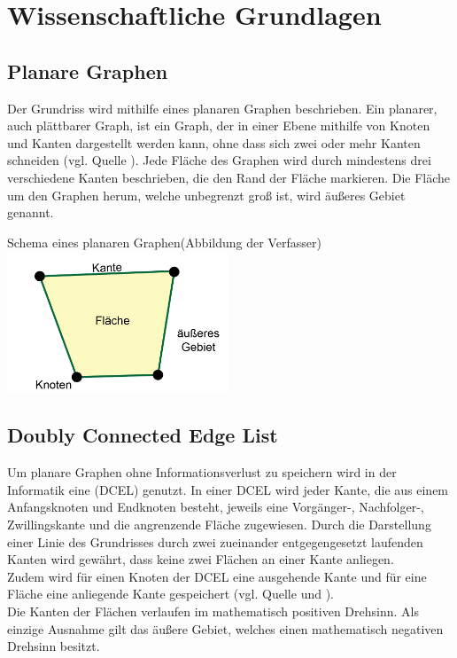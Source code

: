 \chapter{Wissenschaftliche Grundlagen}
\section{Planare Graphen}
Der Grundriss wird mithilfe eines planaren Graphen beschrieben.               
Ein planarer, auch plättbarer Graph, ist ein Graph, der in einer Ebene mithilfe von Knoten und Kanten dargestellt werden kann, ohne dass sich zwei oder mehr Kanten schneiden (vgl. Quelle \cite{planarGraph}). 
Jede Fläche des Graphen wird durch mindestens drei verschiedene Kanten beschrieben, die den Rand der Fläche markieren. 
Die Fläche um den Graphen herum, welche unbegrenzt groß ist, wird äußeres Gebiet genannt.
\begin{Bild}{Schema eines planaren Graphen(Abbildung der Verfasser)}
	\includegraphics[width = 250px]{Bilder/planarerGraph-11}
\end{Bild}

\section{Doubly Connected Edge List}
Um planare Graphen ohne Informationsverlust zu speichern wird in der Informatik eine  (DCEL) genutzt.
In einer DCEL wird jeder Kante, die aus einem Anfangsknoten und Endknoten besteht, jeweils eine Vorgänger-, Nachfolger-, Zwillingskante und die angrenzende Fläche zugewiesen. 
Durch die Darstellung einer Linie des Grundrisses durch zwei zueinander entgegengesetzt laufenden Kanten wird gewährt, dass keine zwei Flächen an einer Kante anliegen.\\
Zudem wird für einen Knoten der DCEL eine ausgehende Kante und für eine Fläche eine anliegende Kante gespeichert (vgl. Quelle \cite{dcel} und \cite{dcelwiki}). \\
Die Kanten der Flächen verlaufen im mathematisch positiven Drehsinn.
Als einzige Ausnahme gilt das äußere Gebiet, welches einen mathematisch negativen Drehsinn besitzt.

